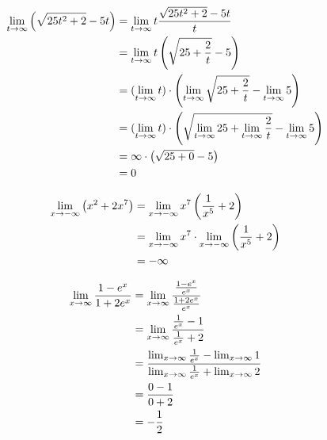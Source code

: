\documentclass{../../../classes/anal}
\begin{document}

    \begin{equation*}
        \begin{aligned}
            \lim_{t\to\infty} \left(\sqrt{25t^2 + 2} - 5t\right)
            &= \lim_{t\to\infty} t{\sqrt{25t^2 + 2} - 5t \over t} \\
            &= \lim_{t\to\infty} t\left(\sqrt{25 + {2 \over t}} - 5\right) \\
            &= (\lim_{t\to\infty} t) \cdot \left(\lim_{t\to\infty}\sqrt{25 + {2 \over t}} - \lim_{t\to\infty}5\right) \\
            &= (\lim_{t\to\infty} t) \cdot \left(\sqrt{\lim_{t\to\infty}25 + \lim_{t\to\infty}{2 \over t}} - \lim_{t\to\infty}5\right) \\
            &= \infty \cdot \left(\sqrt{25 + 0} - 5\right) \\
            &= 0 \\
        \end{aligned}
    \end{equation*}


    \begin{equation*}
        \begin{aligned}
            \lim_{x\to-\infty} \left(x^2 + 2x^7\right)
            &= \lim_{x\to-\infty} x^7\left({1 \over x^5} + 2\right) \\
            &= \lim_{x\to-\infty} x^7 \cdot \lim_{x\to-\infty} \left({1 \over x^5} + 2\right) \\
            &= -\infty
        \end{aligned}
    \end{equation*}


    \begin{equation*}
        \begin{aligned}
            \lim_{x\to\infty}{1 - e^x \over 1 + 2e^x}
            &= \lim_{x\to\infty}{{1 - e^x \over e^x} \over {1 + 2e^x \over e^x}} \\
            &= \lim_{x\to\infty}{{1 \over e^x} - 1 \over {1 \over e^x} + 2} \\
            &= {\lim_{x\to\infty}{1 \over e^x} - \lim_{x\to\infty} 1 \over \lim_{x\to\infty} {1 \over e^x} + \lim_{x\to\infty} 2} \\
            &= {0 - 1 \over 0 + 2} \\
            &= -{1 \over 2}
        \end{aligned}
    \end{equation*}
\end{document}
